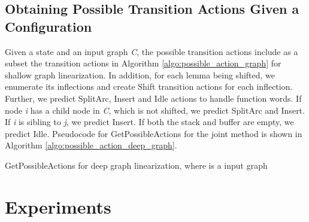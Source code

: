 \documentclass[11pt]{article}
\begin{document}
\subsection{Obtaining Possible Transition Actions Given a Configuration}
Given a state  and an input graph {\it C}, the possible transition actions include as a subset the transition actions in Algorithm \ref{algo:possible_action_graph} for shallow graph linearization. In addition, for each lemma being shifted, we enumerate its inflections and create {\sc Shift} transition actions for each inflection. Further, we predict {\sc SplitArc}, {\sc Insert} and {\sc Idle} actions to handle function words. If node {\it i} has a child node in {\it C}, which is not shifted, we predict {\sc SplitArc} and {\sc Insert}. If {\it i} is sibling to {\it j}, we predict {\sc Insert}. If both the stack and buffer are empty, we predict {\sc Idle}. Pseudocode for {\sc GetPossibleActions} for the joint method is shown in Algorithm \ref{algo:possible_action_deep_graph}. \begin{algorithm}[!ht]
\small
\DontPrintSemicolon {}
\;
\If{} {
  \For{} {
    \;
  }
} 

\If{\textsc{  }}{
 \;
}
\Return{}\;
\caption{{\sc GetPossibleActions} for deep graph linearization, where  is a input graph}
\label{algo:possible_action_deep_graph}
\end{algorithm}


\section{Experiments}
\end{document}
